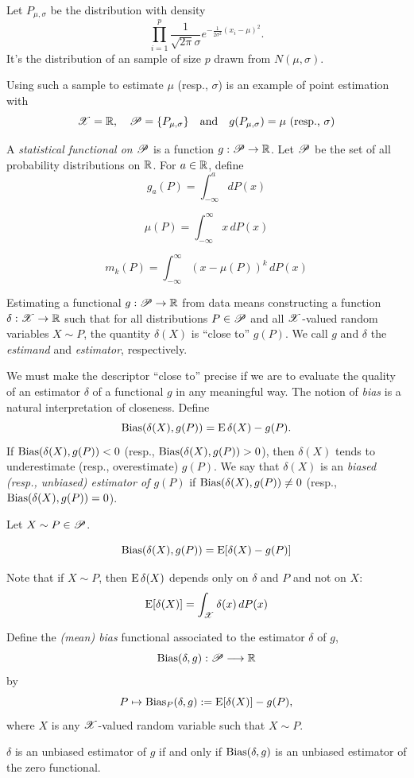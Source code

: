 \documentclass[12pt]{amsart}
\begin{document}
Let $P_{\mu,\sigma}$ be the distribution with density
\[
\prod_{i=1}^p\frac1{\sqrt{2\pi}\sigma}e^{-\frac1{2\sigma^2}(x_i-\mu)^2}.
\]
It's the distribution of an \iid sample of size $p$ drawn from $N(\mu,\sigma)$.

Using such a sample to estimate $\mu$ (resp., $\sigma$) is an example of point estimation with
\[
\mathscr{X}=\mathbb{R},\quad \mathscr{P}=\{P_{\mu,\sigma}\}\quad\text{and}\quad
\text{$g(P_{\mu,\sigma})=\mu$ (resp., $\sigma)$}
\]

A \emph{statistical functional on $\mathscr{P}$} is a function $g:\mathscr{P}\to\mathbb{R}$.
Let $\mathscr{P}$ be the set of all probability distributions on $\mathbb{R}$.
For $a\in\mathbb{R}$, define $$g_a(P)=\int_{-\infty}^adP(x)$$

$$\mu(P)=\int_{-\infty}^\infty x\,dP(x)$$

$$m_k(P)=\int_{-\infty}^\infty (x-\mu(P))^k\,dP(x)$$

Estimating a functional $g:\mathscr{P}\to\mathbb{R}$ from data means
constructing a function $\delta:\mathscr{X}\to\mathbb{R}$ such that for all distributions $P\in\mathscr{P}$ and all $\mathscr{X}$-valued random variables $X\sim P$, the quantity $\delta(X)$ is ``close to'' $g(P)$.
We call $g$ and $\delta$ the \emph{estimand} and \emph{estimator}, respectively.

We must make the descriptor ``close to'' precise if we are to evaluate the quality of an estimator $\delta$ of a functional $g$ in any meaningful way.
The notion of \emph{bias} is a natural interpretation of closeness.
Define
\[
    \operatorname{Bias}(\delta(X), g(P)) = \operatorname{E}\delta(X) - g(P).
\]
If $\operatorname{Bias}(\delta(X), g(P))<0$ (resp., $\operatorname{Bias}(\delta(X), g(P))>0$), then $\delta(X)$ tends to underestimate (resp., overestimate) $g(P)$.
We say that $\delta(X)$ is an \emph{biased (resp., unbiased) estimator of $g(P)$}
if $\operatorname{Bias}(\delta(X), g(P))\neq0$
(resp., $\operatorname{Bias}(\delta(X), g(P))=0$).


Let $X\sim P\in \mathscr{P}$.

$$\operatorname{Bias}(\delta(X), g(P))=\operatorname{E}[\delta(X) - g(P)]$$

Note that if $X\sim P$, then $\operatorname{E}\delta(X)$ depends only on $\delta$ and $P$ and not on $X$:
\[
    \operatorname{E}[\delta(X)] = \int_{\mathscr{X}}\delta(x)\,dP(x)
\]

Define the \emph{(mean) bias} functional associated to the estimator $\delta$ of $g$,
\[
    \operatorname{Bias}(\delta, g):\mathscr{P}\longrightarrow\mathbb{R}
\]
by
\[
    P\mapsto\operatorname{Bias}_P(\delta, g) := \operatorname{E}[\delta(X)] - g(P),
\]
where $X$ is any $\mathscr{X}$-valued random variable such that $X\sim P$.

$\delta$ is an unbiased estimator of $g$ if and only if $\operatorname{Bias}(\delta, g)$ is an unbiased estimator of the zero functional.
\end{document}
